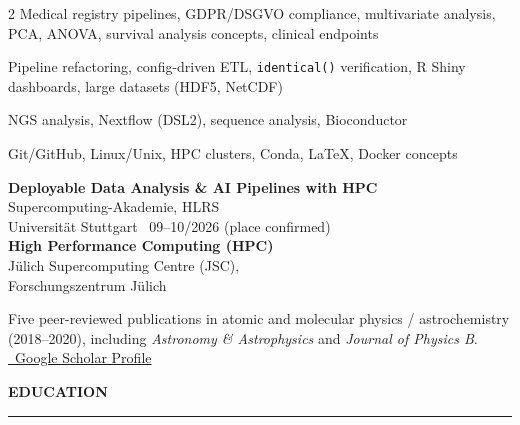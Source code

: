 \documentclass{thejus_cv}
\begin{document}
\begin{paracol}{2}
         {Medical registry pipelines, GDPR/DSGVO compliance, multivariate analysis, PCA, ANOVA, survival analysis concepts, clinical endpoints}

         {Pipeline refactoring, config-driven ETL, \texttt{identical()} verification, R Shiny dashboards, large datasets (HDF5, NetCDF)}

         {NGS analysis, Nextflow (DSL2), sequence analysis, Bioconductor}

         {Git/GitHub, Linux/Unix, HPC clusters, Conda, LaTeX, Docker concepts}





\textbf{Deployable Data Analysis \& AI Pipelines with HPC}\\
{\small Supercomputing-Akademie, HLRS\\
Universit\"at Stuttgart \textbar\ 09--10/2026 (place confirmed)}\\[0.3cm]

\textbf{High Performance Computing (HPC)}\\
{\small J\"ulich Supercomputing Centre (JSC),\\
Forschungszentrum J\"ulich}\\[0.4cm]


{\small
Five peer-reviewed publications in atomic and molecular physics / astrochemistry (2018--2020), including \textit{Astronomy \& Astrophysics} and \textit{Journal of Physics B}.
}\\[0.3cm]
\href{https://scholar.google.com/citations?user=PJkZwAwAAAAJ}{\faGraduationCap\ Google Scholar Profile}

\end{paracol}

\begin{center}
    \vspace{0.1em}
    {\Large\textbf{EDUCATION}}\\
    {\color{cvtext}\rule{0.5\linewidth}{1.5pt}}\par
    \vspace{0.3em}
\end{center}
\end{document}
